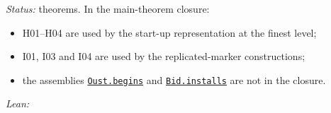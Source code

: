 \documentclass[
  letterpaper,
  11pt]{article}
\providecommand{\tightlist}{%
  \setlength{\itemsep}{0pt}\setlength{\parskip}{0pt}}
\begin{document}
\emph{Status:} theorems. In the main-theorem closure:

\begin{itemize}
\tightlist
\item
  H01--H04 are used by the start-up representation at the finest level;
\item
  I01, I03 and I04 are used by the replicated-marker constructions;
\item
  the assemblies
  \href{https://github.com/yang-mills-group/OpenAI-YM-20261028/blob/3456e5e75cf8d4cd558955a5c7638fba2d68f464/YM/Bid/Kitchen.lean\#L56-L66}{\texttt{Oust.begins}}
  and
  \href{https://github.com/yang-mills-group/OpenAI-YM-20261028/blob/3456e5e75cf8d4cd558955a5c7638fba2d68f464/YM/Bid/Fuels.lean\#L146-L174}{\texttt{Bid.installs}}
  are not in the closure.
\end{itemize}

\emph{Lean:}
\end{document}
